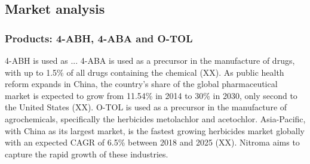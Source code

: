 
\subsection{Market analysis}
\subsubsection{Products: 4-ABH, 4-ABA and O-TOL}
4-ABH is used as ... 4-ABA is used as a precursor in the manufacture of drugs, with up to 1.5\% of all drugs containing the chemical (XX). As public health reform expands in China, the country's share of the global pharmaceutical market is expected to grow from 11.54\% in 2014 to 30\% in 2030, only second to the United States (XX). O-TOL is used as a precursor in the manufacture of agrochemicals, specifically the herbicides metolachlor and acetochlor. Asia-Pacific, with China as its largest market, is the fastest growing herbicides market globally with an expected CAGR of 6.5\% between 2018 and 2025 (XX). Nitroma aims to capture the rapid growth of these industries. 
